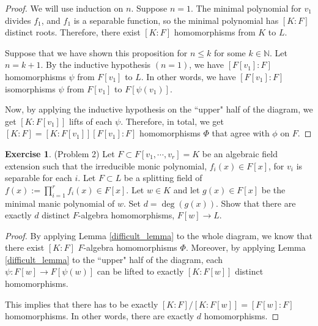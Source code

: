 \documentclass[12pt, psamsfonts]{amsart}
\theoremstyle{definition}
\newtheorem*{exer}{Exercise}
\theoremstyle{remark}
\DeclareMathOperator{\Id}{Id}
\numberwithin{equation}{section}
\begin{document}
\begin{proof}
  We will use induction on $n$.
  Suppose $n = 1$.
  The minimal polynomial for $v_1$ divides $f_1$, and $f_1$ is a separable function, so the minimal polynomial has $[K:F]$ distinct roots.
  Therefore, there exist $[K:F]$ homomorphisms from $K$ to $L$.

  Suppose that we have shown this proposition for $n \leq k$ for some $k \in \mathbb{N}$.
  Let $n = k + 1$.
  By the inductive hypothesis $(n = 1)$, we have $[F[v_1]:F]$ homomorphisms $\psi$ from $F[v_1]$ to $L$.
  In other words, we have $[F[v_1]:F]$ isomorphisms $\psi$ from $F[v_1]$ to $F[\psi(v_1)]$.
  \begin{center}
  \end{center}
  Now, by applying the inductive hypothesis on the ``upper" half of the diagram, we get $[K:F[v_1]]$ lifts of each $\psi$.
  Therefore, in total, we get $[K:F] = [K:F[v_1]][F[v_1]:F]$ homomorphisms $\Phi$ that agree with $\phi$ on $F$.
\end{proof}

\begin{exer}{(Problem 2)}
  Let $F \subset F[v_1, \cdots, v_r] = K$ be an algebraic field extension such that the irreducible monic polynomial, $f_i(x) \in F[x]$, for $v_i$ is separable for each $i$.
  Let $F \subset L$ be a splitting field of $f(x) := \prod_{i=1}^r f_i(x) \in F[x]$.
  Let $w \in K$ and let $g(x) \in F[x]$ be the minimal manic polynomial of $w$.
  Set $d = \deg(g(x))$.
  Show that there are exactly $d$ distinct $F$-algebra homomorphisms, $F[w] \rightarrow L$.
\end{exer}

\begin{proof}
  By applying Lemma \ref{difficult_lemma} to the whole diagram, we know that there exist $[K:F]$ $F$-algebra homomorphisms $\Phi$.
  Moreover, by applying Lemma \ref{difficult_lemma} to the ``upper" half of the diagram, each $\psi:F[w] \rightarrow F[\psi(w)]$ can be lifted to exactly $[K:F[w]]$ distinct homomorphisms.
  \begin{center}
  \end{center}
  This implies that there has to be exactly $[K:F]/[K:F[w]] = [F[w]:F]$ homomorphisms.
  In other words, there are exactly $d$ homomorphisms.
\end{proof}
\end{document}

